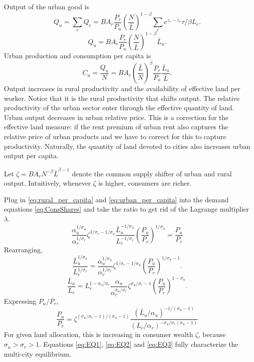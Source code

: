 \documentclass[12pt]{article}
\begin{document}
Output of the urban good is
\[
Q_u = \sum_c Q_c
= B A_r \frac{P_r}{P_u}
\left(\frac {N}
	{{\bar L}}
\right)^{1-\beta}
\sum_c e^{z_c-\tilde z_c}\tau/\beta L_c.
\]
\[
Q_u =  B A_r \frac{P_r}{P_u}
\left(\frac {N}
	{{\bar L}}
\right)^{1-\beta}
\bar L_u.
\]
Urban production and consumption per capita is
\begin{equation}\label{eq:urban_per_capita}
C_u=\frac {Q_u}{N} =
B A_r \left(\frac{{\bar L}}{N}\right)^{\beta}
 \frac{P_r}{P_u}
\frac {\bar L_u}
	{{\bar L}}
.
\end{equation}
Output increases in rural productivity and the availability of effective land per worker. Notice that it is the rural productivity that shifts output. The relative productivity of the urban sector enter through the effective quantity of land. Urban output decreases in urban relative price. This is a correction for the effective land measure: if the rent premium of urban rent also captures the relative price of urban products and we have to correct for this to capture productivity. Naturally, the quantity of land devoted to cities also increases urban output per capita.

Let $\zeta = B A_r N^{-\beta}{{\bar L}}^{\beta-1}$ denote the common supply shifter of urban and rural output. Intuitively, whenever $\zeta$ is higher, consumers are richer.

Plug in \eqref{eq:rural_per_capita} and \eqref{eq:urban_per_capita} into the demand equations \eqref{eq:ConsShares} and take the ratio to get rid of the Lagrange multiplier $\lambda$.
\[
\frac{\alpha_u^{1/\sigma_u}}{\alpha_r^{1/\sigma_r}}
\zeta^{1/\sigma_r-1/\sigma_u}
\frac {\bar L_u^{-1/\sigma_u}}
{L_r^{-1/\sigma_r}}
\left(\frac {P_u}{P_r}\right)^{1/\sigma_u}
= \frac {P_u}{P_r}
\]
Rearranging,
\[
\frac {\bar L_u^{1/\sigma_u}}
{L_r^{1/\sigma_r}}
=
\frac{\alpha_u^{1/\sigma_u}}{\alpha_r^{1/\sigma_r}}
\zeta^{1/\sigma_r-1/\sigma_u}
\left(\frac {P_u}{P_r}\right)^{1/\sigma_u-1}
.\]
\[
\frac {\bar L_u}
{L_r}
=
L_r^{1-\sigma_u/\sigma_r}
\frac{\alpha_u}{\alpha_r^{\sigma_u/\sigma_r}}
\zeta^{\sigma_u/\sigma_r-1}
\left(\frac {P_u}{P_r}\right)^{1-\sigma_u}
.\]
Expressing
 $P_u/P_r$,
\begin{equation}\label{eq:EQ3}\tag{iii}
\frac {P_u}{P_r}
=
\zeta^{(\sigma_u/\sigma_r-1)/(\sigma_u-1)}
\frac {(\bar L_u/\alpha_u)^{-1/(\sigma_u-1)}}
{(L_r/\alpha_r)^{-\sigma_u/\sigma_r(\sigma_u-1)}}
\end{equation}
For given land allocation, this is increasing in consumer wealth $\zeta$, because $\sigma_u>\sigma_r>1$. Equations \eqref{eq:EQ1}, \eqref{eq:EQ2} and \eqref{eq:EQ3} fully characterize the multi-city equilibrium.
\end{document}
